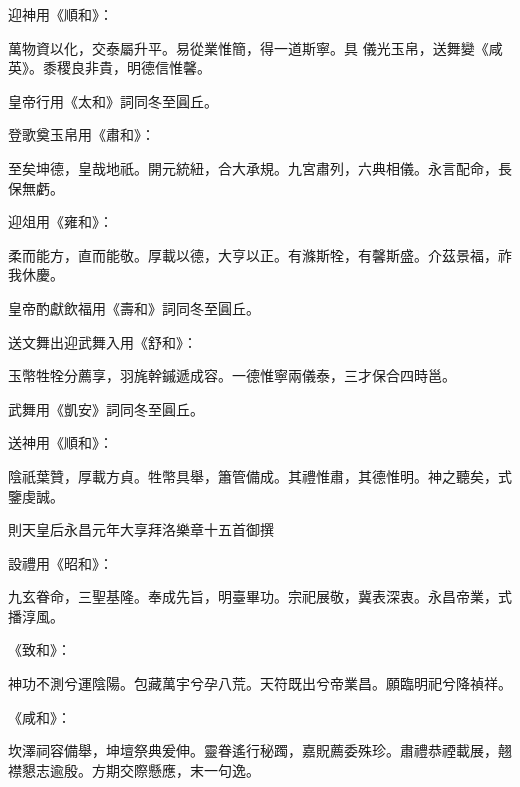 \begin{pinyinscope}
 迎神用《順和》：



 萬物資以化，交泰屬升平。易從業惟簡，得一道斯寧。具
 儀光玉帛，送舞變《咸英》。黍稷良非貴，明德信惟馨。



 皇帝行用《太和》詞同冬至圓丘。



 登歌奠玉帛用《肅和》：



 至矣坤德，皇哉地祇。開元統紐，合大承規。九宮肅列，六典相儀。永言配命，長保無虧。



 迎俎用《雍和》：



 柔而能方，直而能敬。厚載以德，大亨以正。有滌斯牷，有馨斯盛。介茲景福，祚我休慶。



 皇帝酌獻飲福用《壽和》詞同冬至圓丘。



 送文舞出迎武舞入用《舒和》：



 玉幣牲牷分薦享，羽旄幹鏚遞成容。一德惟寧兩儀泰，三才保合四時邕。



 武舞用《凱安》詞同冬至圓丘。



 送神用《順和》：



 陰祇葉贊，厚載方貞。牲幣具舉，簫管備成。其禮惟肅，其德惟明。神之聽矣，式鑒虔誠。



 則天皇后永昌元年大享拜洛樂章十五首御撰



 設禮用《昭和》：



 九玄眷命，三聖基隆。奉成先旨，明臺畢功。宗祀展敬，冀表深衷。永昌帝業，式播淳風。



 《致和》：



 神功不測兮運陰陽。包藏萬宇兮孕八荒。天符既出兮帝業昌。願臨明祀兮降禎祥。



 《咸和》：



 坎澤祠容備舉，坤壇祭典爰伸。靈眷遙行秘躅，嘉貺薦委殊珍。肅禮恭禋載展，翹襟懇志逾殷。方期交際懸應，末一句逸。




\end{pinyinscope}

